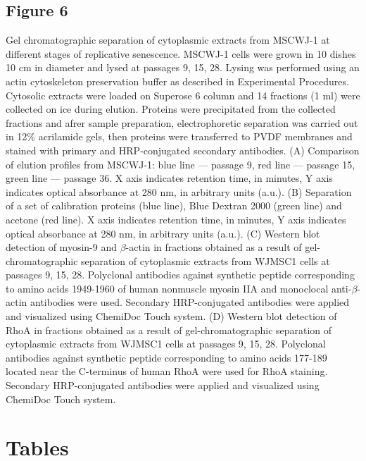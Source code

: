 \documentclass[alpha-refs]{wiley-article}
\begin{document}
\subsection*{Figure 6}
Gel chromatographic separation of cytoplasmic extracts from MSCWJ-1 at different stages of replicative senescence.
MSCWJ-1 cells were grown in 10 dishes 10 cm in diameter and lysed at passages  9, 15, 28.
Lysing was performed using an actin cytoskeleton preservation buffer as described in Experimental Procedures.
Cytosolic extracts were loaded on Superose 6 column and 14 fractions (1 ml) were collected on ice during elution.
Proteins were precipitated from the collected fractions and afrer sample preparation, electrophoretic separation was carried out in 12\% acrilamide gels, then proteins were transferred to PVDF membranes and stained with primary and HRP-conjugated secondary antibodies.
(A) Comparison of elution profiles from MSCWJ-1: blue line --- passage 9, red line --- passage 15, green line --- passage 36.
X axis indicates retention time, in minutes, Y axis indicates optical absorbance at 280 nm, in arbitrary units (a.u.).
(B) Separation of a set of calibration proteins (blue line), Blue Dextran 2000 (green line) and acetone (red line).
X axis indicates retention time, in minutes, Y axis indicates optical absorbance at 280 nm, in arbitrary units (a.u.).
(C) Western blot detection of myosin-9 and $\beta$-actin in fractions obtained as a result of gel-chromatographic separation of cytoplasmic extracts from WJMSC1 cells at passages 9, 15, 28.
Polyclonal antibodies against synthetic peptide corresponding to amino acids 1949-1960 of human nonmuscle myosin IIA and monoclocal anti-$\beta$-actin antibodies were used.
Secondary HRP-conjugated antibodies were applied and visualized using ChemiDoc Touch system.
(D) Western blot detection of RhoA in fractions obtained as a result of gel-chromatographic separation of cytoplasmic extracts from WJMSC1 cells at passages 9, 15, 28.
Polyclonal antibodies against synthetic peptide corresponding to amino acids 177-189 located near the C-terminus of human RhoA were used for RhoA staining.
Secondary HRP-conjugated antibodies were applied and visualized using ChemiDoc Touch system.

\section*{Tables}
\end{document}
